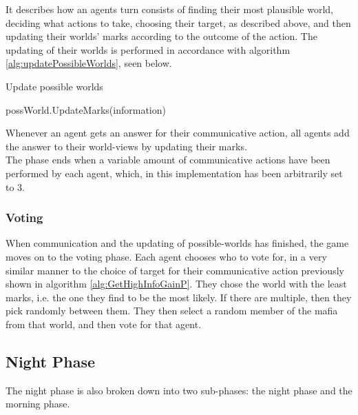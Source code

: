 \setcounter{algorithmcaption}{5}
It describes how an agents turn consists of finding their most plausible world, 
deciding what actions to take, choosing their target, as described above, and 
then updating their worlds' marks according to the outcome of the action.
The updating of their worlds is performed in accordance with algorithm 
\ref{alg:updatePossibleWorlds}, seen below. 
\begin{algorithm}[H]
	\caption{Update possible worlds}
	\begin{algorithmic}[1]
		\State possWorld.UpdateMarks(information)
		\EndFor
		\EndFor
		\EndFunction
	\end{algorithmic}\label{alg:updatePossibleWorlds}
\end{algorithm}
\setcounter{algorithmcaption}{6}
Whenever an agent gets an answer for their communicative action, all agents add 
the answer to their world-views by updating their marks.\\

The phase ends when a variable amount of communicative actions have been 
performed by each agent, which, in this implementation has been arbitrarily set 
to 3. 

\subsubsection{Voting}\label{sec:voting}
When communication and the updating of possible-worlds has finished, the game
moves on to the voting phase. Each agent chooses who to vote for, in a very
similar manner to the choice of target for their communicative action 
previously shown in algorithm \ref{alg:GetHighInfoGainP}. They
chose the world with the least marks, i.e. the one they find to be the most
likely. If there are multiple, then they pick randomly between them. They then
select a random member of the mafia from that world, and then vote for that
agent.
 
\subsection{Night Phase}\label{sec:nightPhase}
The night phase is also broken down into two sub-phases: the night phase and 
the morning phase. 

